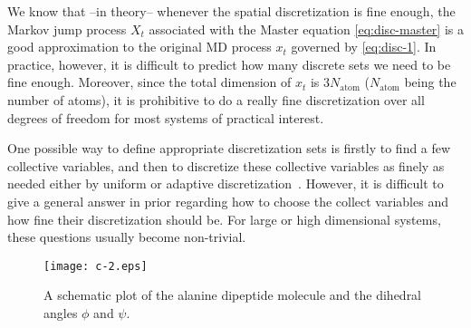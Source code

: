\documentclass[journal=jctcce,manuscript=article]{achemso}
\begin{document}
We know that --in theory-- whenever the spatial discretization is fine enough, the Markov jump
process $X_t$ associated with the Master equation \eqref{eq:disc-master} is a good approximation to the original
MD process $x_t$ governed by \eqref{eq:disc-1}.  In practice, however, it is difficult to predict
how many discrete sets we need to be fine enough. Moreover, since the
total dimension of $x_t$ is $3N_{\textrm{atom}}$ ($N_{\textrm{atom}}$ being the number of atoms), it is prohibitive to do a really fine discretization
over all degrees of freedom for most systems of practical interest.

One possible way to define appropriate discretization sets is firstly to find a few collective
variables, and then to discretize these collective variables as finely as needed either by uniform or adaptive
discretization~\cite{chodera2007automatic, prinz2011markov}.
However, it is difficult to give a general answer in prior regarding
how to choose the collect variables and how fine their discretization should be.
For large or high dimensional systems, these questions usually become non-trivial. 

\begin{figure}
  \centering
  \texttt{[image: c-2.eps]}
  \caption{A schematic plot of the alanine dipeptide molecule and the dihedral angles $\phi$ and $\psi$.}
  \label{fig:tmp1}
\end{figure}
\end{document}
